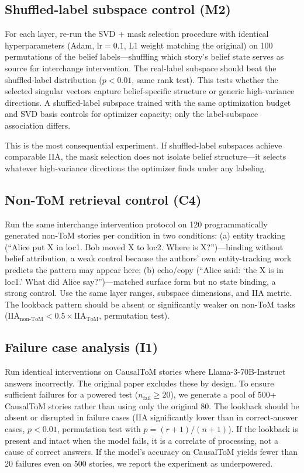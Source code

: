 \documentclass[11pt]{article}
\begin{document}
\subsection{Shuffled-label subspace control (M2)}

For each layer, re-run the SVD + mask selection procedure with identical hyperparameters (Adam, $\text{lr} = 0.1$, L1 weight matching the original) on 100 permutations of the belief labels---shuffling which story's belief state serves as source for interchange intervention. The real-label subspace should beat the shuffled-label distribution ($p < 0.01$, same rank test). This tests whether the selected singular vectors capture belief-specific structure or generic high-variance directions. A shuffled-label subspace trained with the same optimization budget and SVD basis controls for optimizer capacity; only the label-subspace association differs.

This is the most consequential experiment. If shuffled-label subspaces achieve comparable IIA, the mask selection does not isolate belief structure---it selects whatever high-variance directions the optimizer finds under any labeling.

\subsection{Non-ToM retrieval control (C4)}

Run the same interchange intervention protocol on 120 programmatically generated non-ToM stories per condition in two conditions: (a) entity tracking (``Alice put X in loc1. Bob moved X to loc2. Where is X?'')---binding without belief attribution, a weak control because the authors' own entity-tracking work predicts the pattern may appear here; (b) echo/copy (``Alice said: `the X is in loc1.' What did Alice say?'')---matched surface form but no state binding, a strong control. Use the same layer ranges, subspace dimensions, and IIA metric. The lookback pattern should be absent or significantly weaker on non-ToM tasks ($\text{IIA}_{\text{non-ToM}} < 0.5 \times \text{IIA}_{\text{ToM}}$, permutation test).

\subsection{Failure case analysis (I1)}

Run identical interventions on CausalToM stories where Llama-3-70B-Instruct answers incorrectly. The original paper excludes these by design. To ensure sufficient failures for a powered test ($n_{\text{fail}} \geq 20$), we generate a pool of 500+ CausalToM stories rather than using only the original 80. The lookback should be absent or disrupted in failure cases (IIA significantly lower than in correct-answer cases, $p < 0.01$, permutation test with $p = (r + 1)/(n + 1)$). If the lookback is present and intact when the model fails, it is a correlate of processing, not a cause of correct answers. If the model's accuracy on CausalToM yields fewer than 20 failures even on 500 stories, we report the experiment as underpowered.
\end{document}
